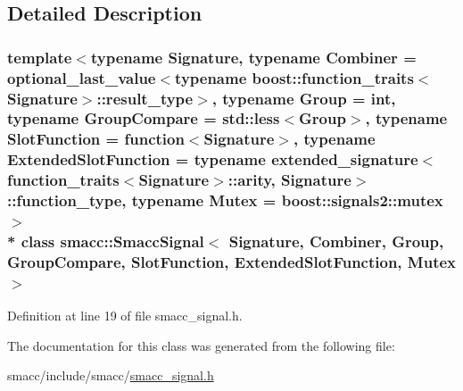 \subsection{Detailed Description}
\subsubsection*{template$<$typename Signature, typename Combiner = optional\+\_\+last\+\_\+value$<$typename boost\+::function\+\_\+traits$<$\+Signature$>$\+::result\+\_\+type$>$, typename Group = int, typename Group\+Compare = std\+::less$<$\+Group$>$, typename Slot\+Function = function$<$\+Signature$>$, typename Extended\+Slot\+Function = typename extended\+\_\+signature$<$function\+\_\+traits$<$\+Signature$>$\+::arity, Signature$>$\+::function\+\_\+type, typename Mutex = boost\+::signals2\+::mutex$>$\\*
class smacc\+::\+Smacc\+Signal$<$ Signature, Combiner, Group, Group\+Compare, Slot\+Function, Extended\+Slot\+Function, Mutex $>$}



Definition at line 19 of file smacc\+\_\+signal.\+h.



The documentation for this class was generated from the following file\+:\begin{DoxyCompactItemize}
\item 
smacc/include/smacc/\hyperlink{smacc__signal_8h}{smacc\+\_\+signal.\+h}\end{DoxyCompactItemize}
